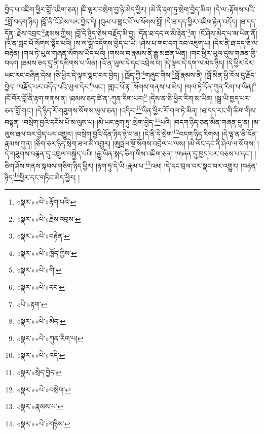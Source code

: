 བྱེད་པ་འཇིག་ཕྱིར་བློ་འཇིག་ཅན། །ཇི་ལྟར་བསྲེག་བྱ་ཉེ་མེད་ཕྱིར། །མེ་ནི་རྟག་ཏུ་སྲེག་བྱེད་མིན། །དེ་ལ་:རྟོགས་པའི་\footnote{«སྣར་»«པེ་»རྟོག་པའི་}བློ་བདག་ཉིད། །བློ་ནི་ངོ་ཤེས་པར་བྱེད་དེ། །བུམ་པ་གླང་པོ་ལ་སོགས་བློ། །དེ་ཐ་དད་ཕྱིར་འཇིག་རྟེན་འདོད། །ཐ་དད་དོན་:རྗེས་འབྲང་\footnote{«སྣར་»«པེ་»རྗེས་འབྲས་}རྣམས་ཀྱིས། །བློ་དེ་ཉིད་ཅེས་བརྗོད་མི་བྱ། །དོན་ཐ་དད་ལ་མི་རྟེན་\footnote{«སྣར་»«པེ་»བརྟེན་}ན། །ངོ་ཤེས་མེད་པ་མ་ཡིན་ནོ། །འོ་ན་གླང་པོ་སོགས་སྟོང་པའི། །ས་ལ་སྒྲོ་འདོགས་བྱེད་པ་ཡི། །ཤེས་པ་གང་དག་རབ་འཇུག་པ། །དེར་ནི་ཐ་དད་ཅི་ལ་བརྟེན། །གལ་ཏེ་ཡུལ་གཞན་སོགས་ཡོད་པའི། །གསལ་བ་རྣམས་ནི་རྒྱུ་མཚན་ཡིན། །གང་ཕྱིར་ཡུལ་དུས་གཞན་གྱི་བདག །ཐམས་ཅད་དུ་ནི་དམིགས་པ་ཡིན། །འོ་ན་ཡུལ་དེ་དང་འབྲེལ་བ། །དེ་ལྟར་དེ་དག་ལ་མེད་ཉིད། །དེ་ཕྱིར་དེར་ཡང་རང་བཞིན་དེས། །ཅི་ཕྱིར་དེ་ལྟར་སྣང་བར་བྱེད། །:ཁྱོད་ཀྱི་\footnote{«སྣར་»«པེ་»ཁྱོད་ཀྱིས་}གཞུང་གིས་\footnote{«སྣར་»«པེ་»གི་}བློ་རྣམས་ནི། །བློ་མིན་ཕྱི་རོལ་དུ་རྗོད་བྱེད། །བརྗོད་པར་འདོད་པའི་ཡུལ་དེར་\footnote{«སྣར་»«པེ་»དང་}ཡང་། །གླང་པོ་རྟ་\footnote{«པེ་»རྟག་}སོགས་གནས་པ་མེད། །གལ་ཏེ་དོན་ཀུན་རིག་པ་ཡིན།\footnote{«སྣར་»«པེ་»མེད།} །ངོ་བོར་བློ་ནི་རྟག་གནས་ན། །ཐམས་ཅད་ཚེ་ན་:ཀུན་རིག་པར།\footnote{«སྣར་»«པེ་»ཀུན་རིག་པ།} །དེས་ན་ཅི་ཕྱིར་རིག་མ་ཡིན། །སྒྲ་ཡི་ཁྱད་པར་ཅན་བློ་གང་། །དེ་ཉིད་རོ་གཟུགས་སོགས་ཡུལ་ཅན། །འདིར་\footnote{«སྣར་»«པེ་»འདི་}ཡིན་ཕྱིར་རོ་གལ་ཏེ་མིན། །ཐ་དད་རང་གི་ཚིག་གིས་བསྟན། །བསྲེག་བྱའི་དངོས་པོ་མ་ལུས་པ། །མེ་ཡང་རྟག་ཏུ་:སྲེག་བྱེད་\footnote{«སྣར་»སྲེད་བྱེད་}པའི། །བདག་ཉིད་ཅན་མིན་གཞན་དུ་ན། །མ་ལུས་ཐལ་བར་བྱེད་པར་འགྱུར། །བསྲེག་བྱའི་དོན་ཉིད་ཉེ་བ་ན། །དེ་ནི་དེ་སྲེག་\footnote{«སྣར་»«པེ་»བསྲེག་}བདག་ཉིད་རིགས། །དེ་ལྟ་ན་ནི་དོན་རྣམས་ཀུན། །ཅིག་ཅར་ཉིད་སྲེག་ཐལ་མི་འགྱུར། །ཨུཏྤལ་སྔོ་སོགས་འབྲེལ་པ་ལས། །མེ་ལོང་དང་ནི་ཤེལ་ལ་སོགས། །དེ་གཟུགས་བརྙན་དུ་འཁྲུལ་བསྐྱེད་པའི། །རྒྱུ་ཡིན་སྐད་ཅིག་གིས་འཇིག་ཅན། །གཞན་དུ་ཁྱད་པར་བཅས་པ་དང་། །ཅིག་ཤོས་གནས་སྐབས་གཅིག་ཉིད་ཕྱིར། །རྟག་ཏུ་དེ་ཡི་:རྣམ་པ་\footnote{«སྣར་»རྣམས་པ་}འམ། །དེ་དང་བྲལ་བར་སྣང་བར་འགྱུར། །བརྟན་ཉིད་\footnote{«སྣར་»«པེ་»གཉིས་}ཕྱིར་དང་གཏིང་མེད་ཕྱིར། །
